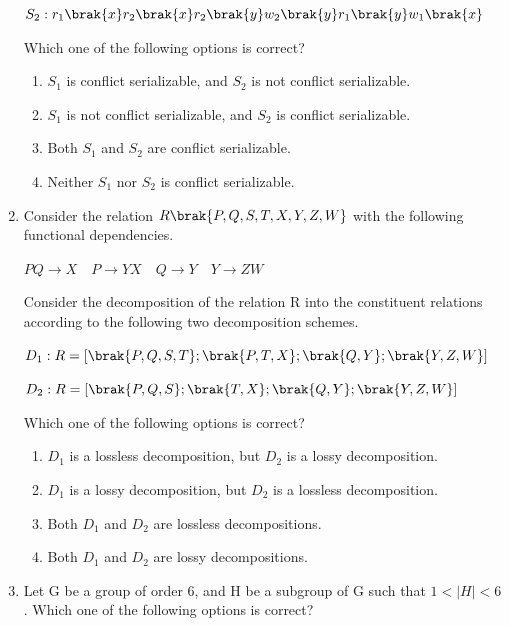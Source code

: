 \documentclass[a4paper, 11pt]{article}
\begin{document}
\begin{enumerate}
\begin{center}
    $S_2: r_1\brak{x} r_2\brak{x} r_2\brak{y} w_2\brak{y} r_1\brak{y} w_1\brak{x}$
    \end{center}
    Which one of the following options is correct?
    \begin{enumerate}
        \item $S_1$ is conflict serializable, and $S_2$ is not conflict serializable.
        \item $S_1$ is not conflict serializable, and $S_2$ is conflict serializable.
        \item Both $S_1$ and $S_2$ are conflict serializable.
        \item Neither $S_1$ nor $S_2$ is conflict serializable.
    \end{enumerate}
    \hfill{}
    
    \item Consider the relation $R\brak{P,Q,S,T,X,Y,Z,W}$ with the following functional dependencies.
    \begin{center}
    $PQ \rightarrow X \quad P \rightarrow YX \quad Q \rightarrow Y \quad Y \rightarrow ZW$
    \end{center}
    
    Consider the decomposition of the relation R into the constituent relations according to the following two decomposition schemes.
    \begin{center}
    $D_1: R = [\brak{P,Q,S,T}; \brak{P,T,X}; \brak{Q,Y}; \brak{Y,Z,W}]$
    
    $D_2: R = [\brak{P,Q,S}; \brak{T,X}; \brak{Q,Y}; \brak{Y,Z,W}]$
    \end{center}
    Which one of the following options is correct?
    \begin{enumerate}
        \item $D_1$ is a lossless decomposition, but $D_2$ is a lossy decomposition.
        \item $D_1$ is a lossy decomposition, but $D_2$ is a lossless decomposition.
        \item Both $D_1$ and $D_2$ are lossless decompositions.
        \item Both $D_1$ and $D_2$ are lossy decompositions.
    \end{enumerate}
    \hfill{}
    
    \item Let G be a group of order 6, and H be a subgroup of G such that $1 < |H| < 6$. Which one of the following options is correct?
    

\end{enumerate}
\end{document}
